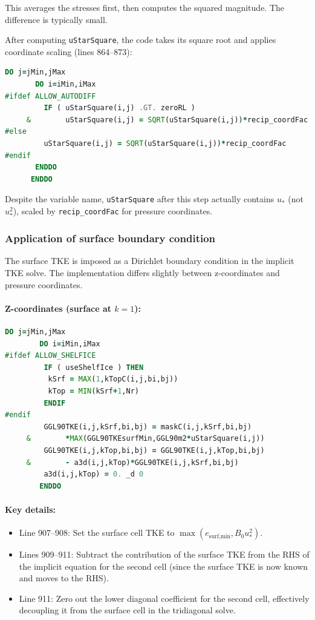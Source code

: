 \documentclass[12pt,letterpaper]{article}
\begin{document}
This averages the stresses first, then computes the squared magnitude. The difference is typically small.

After computing \verb|uStarSquare|, the code takes its square root and applies coordinate scaling (lines 864--873):

\begin{lstlisting}[language=Fortran,caption={(ggl90\_calc.F:L864--873) Square root and coordinate transformation}]
      DO j=jMin,jMax
       DO i=iMin,iMax
#ifdef ALLOW_AUTODIFF
         IF ( uStarSquare(i,j) .GT. zeroRL )
     &        uStarSquare(i,j) = SQRT(uStarSquare(i,j))*recip_coordFac
#else
         uStarSquare(i,j) = SQRT(uStarSquare(i,j))*recip_coordFac
#endif
       ENDDO
      ENDDO
\end{lstlisting}

Despite the variable name, \verb|uStarSquare| after this step actually contains $u_*$ (not $u_*^2$), scaled by \verb|recip_coordFac| for pressure coordinates.

\subsubsection{Application of surface boundary condition}

The surface TKE is imposed as a Dirichlet boundary condition in the implicit TKE solve. The implementation differs slightly between z-coordinates and pressure coordinates.

\paragraph{Z-coordinates (surface at $k=1$):}

\begin{lstlisting}[language=Fortran,caption={(ggl90\_calc.F:L899--912) Surface BC in z-coordinates}]
       DO j=jMin,jMax
        DO i=iMin,iMax
#ifdef ALLOW_SHELFICE
         IF ( useShelfIce ) THEN
          kSrf = MAX(1,kTopC(i,j,bi,bj))
          kTop = MIN(kSrf+1,Nr)
         ENDIF
#endif
         GGL90TKE(i,j,kSrf,bi,bj) = maskC(i,j,kSrf,bi,bj)
     &        *MAX(GGL90TKEsurfMin,GGL90m2*uStarSquare(i,j))
         GGL90TKE(i,j,kTop,bi,bj) = GGL90TKE(i,j,kTop,bi,bj)
     &        - a3d(i,j,kTop)*GGL90TKE(i,j,kSrf,bi,bj)
         a3d(i,j,kTop) = 0. _d 0
        ENDDO
\end{lstlisting}

\paragraph{Key details:}
\begin{itemize}
\item Line 907--908: Set the surface cell TKE to $\max(e_{\text{surf,min}}, B_0 u_*^2)$.
\item Lines 909--911: Subtract the contribution of the surface TKE from the RHS of the implicit equation for the second cell (since the surface TKE is now known and moves to the RHS).
\item Line 911: Zero out the lower diagonal coefficient for the second cell, effectively decoupling it from the surface cell in the tridiagonal solve.
\end{itemize}
\end{document}
